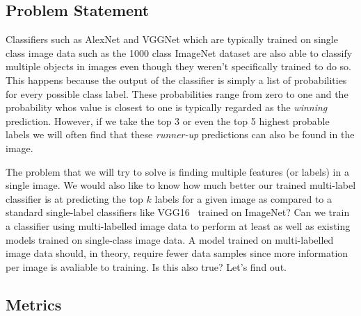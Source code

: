 \documentclass[12pt,journal,compsoc]{IEEEtran}
\begin{document}
\subsection{Problem Statement}




Classifiers such as AlexNet and VGGNet which are typically trained on single class image data such as the 1000 class ImageNet dataset are also able to classify multiple objects in images even though they weren't specifically trained to do so. This happens because the output of the classifier is simply a list of probabilities for every possible class label.  These probabilities range from zero to one and the probability whos value is closest to one is typically regarded as the \textit{winning} prediction.  However, if we take the top 3 or even the top 5 highest probable labels we will often find that these \textit{runner-up} predictions can also be found in the image.  

The problem that we will try to solve is finding multiple features (or labels) in a single image. We would also like to know how much better our trained multi-label classifier is at predicting the top $k$ labels for a given image as compared to a standard single-label classifiers like VGG16~\cite{SimonyanZ14a} trained on ImageNet? Can we train a classifier using multi-labelled image data to perform at least as well as existing models trained on single-class image data.  A model trained on multi-labelled image data should, in theory, require fewer data samples since more information per image is avaliable to training. Is this also true?  Let's find out.


\subsection{Metrics}
\end{document}
